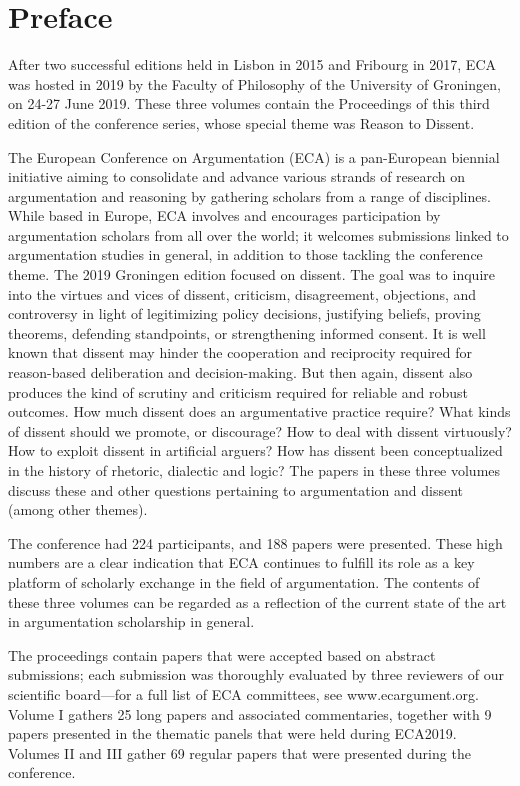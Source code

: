 \section*{Preface}

After two successful editions held in Lisbon in 2015 and Fribourg in 2017, ECA was hosted in 2019 by the Faculty of Philosophy of the University of Groningen, on 24-27 June 2019. These three volumes contain the Proceedings of this third edition of the conference series, whose special theme was Reason to Dissent.

The European Conference on Argumentation (ECA) is a pan-European biennial initiative aiming to consolidate and advance various strands of research on argumentation and reasoning by gathering scholars from a range of disciplines. While based in Europe, ECA involves and encourages participation by argumentation scholars from all over the world; it welcomes submissions linked to argumentation studies in general, in addition to those tackling the conference theme. The 2019 Groningen edition focused on dissent. The goal was to inquire into the virtues and vices of dissent, criticism, disagreement, objections, and controversy in light of legitimizing policy decisions, justifying beliefs, proving theorems, defending standpoints, or strengthening informed consent. It is well known that dissent may hinder the cooperation and reciprocity required for reason-based deliberation and decision-making. But then again, dissent also produces the kind of scrutiny and criticism required for reliable and robust outcomes. How much dissent does an argumentative practice require? What kinds of dissent should we promote, or discourage? How to deal with dissent virtuously? How to exploit dissent in artificial arguers? How has dissent been conceptualized in the history of rhetoric, dialectic and logic? The papers in these three volumes discuss these and other questions pertaining to argumentation and dissent (among other themes).

The conference had 224 participants, and 188 papers were presented. These high numbers are a clear indication that ECA continues to fulfill its role as a key platform of scholarly exchange in the field of argumentation. The contents of these three volumes can be regarded as a reflection of the current state of the art in argumentation scholarship in general.

The proceedings contain papers that were accepted based on abstract submissions; each submission was thoroughly evaluated by three reviewers of our scientific board—for a full list of ECA committees, see www.ecargument.org. Volume I gathers 25 long papers and associated commentaries, together with 9 papers presented in the thematic panels that were held during ECA2019. Volumes II and III gather 69 regular papers that were presented during the conference. 

